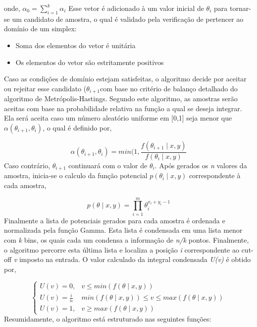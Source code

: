 \documentclass{article}
\begin{document}
onde, $\alpha _0=\sum_{i=1}^{k}\alpha _i$
\indent
Esse vetor é adicionado à um valor inicial de $\theta_i$ para tornar-se um candidato de amostra, o qual é validado pela verificação de pertencer ao domínio de um simplex:

\begin{itemize}
	\item Soma dos elementos do vetor é unitária
	\item Os elementos do vetor são estritamente positivos
\end{itemize}

\indent Caso as condições de domínio estejam satisfeitas, o algoritmo decide por aceitar ou rejeitar esse candidato ($\theta_{i+1}$com base no critério de balanço detalhado do algoritmo de Metrópolis-Hastings. Segundo este algoritmo, as amostras serão aceitas com base na probabilidade relativa na função a qual se deseja integrar. Ela será aceita caso um número aleatório uniforme em [0,1] seja menor que $\alpha(\theta_{i+1}, \theta_{i})$, o qual é definido por,

\begin{equation}
    \alpha(\theta_{i+1}, \theta_{i}) = min(1,\frac{f(\theta_{i+1}\mid x,y)}{f(\theta_{i}\mid x,y)}
\end{equation}
\indent
Caso contrário, $\theta_{i+1}$ continuará com o valor de $\theta_{i}$. Após gerados os \textit{n} valores da amostra, inicia-se o calculo da função potencial $p(\theta_i\mid x,y)$ correspondente à cada amostra,

\begin{equation}
    p(\theta\mid x,y) =  \prod_{i=1}^m  \theta_i^{x_i+y_i-1} 
\end{equation}
\indent
Finalmente a lista de potenciais gerados para cada amostra é ordenada e normalizada pela função Gamma. Esta lista é condensada em uma lista menor com \textit{k} bins, os quais cada um condensa a informação de \textit{n/k} pontos. Finalmente, o algoritmo percorre esta última lista e localiza a posição \textit{i} correspondente ao cut-off \textit{v} imposto na entrada. O valor calculado da integral condensada \textit{U(v)} é obtido por,

\begin{equation}
    \left\{\begin{matrix}
    U(v)= 0, & v \leq min(f(\theta\mid x,y))\\ 
    U(v)= \frac{i}{n} & min(f(\theta\mid x,y)) \leq v \leq max(f(\theta\mid x,y))\\ 
    U(v)= 1, & v \geq max(f(\theta\mid x,y))
    \end{matrix}\right.
\end{equation}
\indent
Resumidamente, o algoritmo está estruturado nas seguintes funções:
\end{document}
